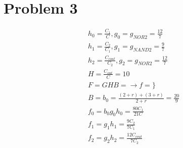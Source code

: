 \documentclass[a4paper,10pt]{article}
\begin{document}
\section*{Problem 3}
\begin{equation}
\begin{split}
&h_0=\frac{C_1}{C}, g_0=g_{NOR2}=\frac{12}{7}\\
&h_1=\frac{C_2}{C_1}, g_1=g_{NAND2}=\frac{9}{7}\\
&h_2=\frac{C_{cout}}{C_2}, g_2=g_{NOR2}=\frac{12}{7}\\
&H=\frac{C_{out}}{C}=10\\
&F=GHB=  \rightarrow f=\}\\
&B=b_0=\frac{(2+r)+(3+r)}{2+r}=\frac{20}{9}\\
&f_0=b_0 g_0 h_0 = \frac{80C_1}{21C}\\
&f_1=g_1 h_1 =\frac{9C_2}{7C_1}\\
&f_2=g_2 h_2 =\frac{12C_{cout}}{7C_2}\\
\end{split}
\end{equation}
\end{document}
